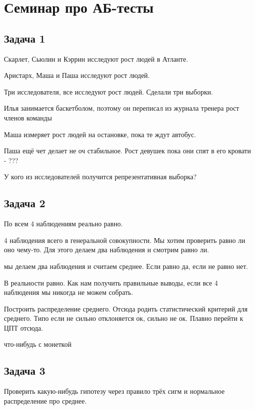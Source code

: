 \documentclass[12pt, a4paper, oneside]{article}
\begin{document}
\section*{Семинар про АБ-тесты }

\subsection*{Задача 1} 

Скарлет, Сьюлин и Кэррин исследуют рост людей в Атланте. 

Аристарх,  Маша и Паша исследуют рост людей. 

Три исследователя, все исследуют рост людей. Сделали три выборки. 

Илья занимается баскетболом, поэтому он переписал из журнала тренера рост членов команды

Маша измеряет рост людей на остановке, пока те ждут автобус. 

Паша ещё чет делает не оч стабильное. Рост девушек пока они спят в его кровати - ???


У кого из исследователей получится репрезентативная выборка? 





\subsection*{Задача 2} 

По всем 4 наблюдениям реально равно. 

4 наблюдения всего в генеральной совокупности.  Мы хотим проверить равно ли оно чему-то.  Для этого делаем два наблюдения и смотрим равно ли. 

мы делаем два наблюдения и считаем среднее. Если равно да, если не равно нет. 

В реальности равно. Как нам получить правильные выводы, если все 4 наблюдения мы никогда не можем собрать. 

Построить распределение среднего. Отсюда родить статистический критерий для среднего.  Типо если не сильно отклоняется ок, сильно не ок. Плавно перейти к ЦПТ отсюда. 


что-нибудь с монеткой


\subsection*{Задача 3} 

Проверить какую-нибудь гипотезу через правило трёх сигм и нормальное распределение про среднее. 
\end{document}
